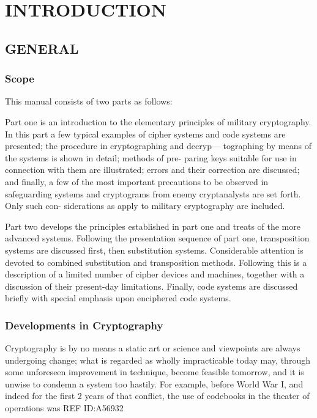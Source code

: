 
\chapter{INTRODUCTION}
 
\section{GENERAL}

\subsection{Scope}

This manual consists of two parts as follows:

\mypara Part one is an introduction to the elementary principles of military
cryptography. In this part a few typical examples of cipher systems and
code systems are presented; the procedure in cryptographing and decryp—
tographing by means of the systems is shown in detail; methods of pre-
paring keys suitable for use in connection with them are illustrated;
errors and their correction are discussed; and ﬁnally, a few of the most
important precautions to be observed in safeguarding systems and
cryptograms from enemy cryptanalysts are set forth. Only such con-
siderations as apply to military cryptography are included.

\mypara Part two develops the principles established in part one and treats
of the more advanced systems. Following the presentation sequence of
part one, transposition systems are discussed ﬁrst, then substitution
systems. Considerable attention is devoted to combined substitution and
transposition methods. Following this is a description of a limited number
of cipher devices and machines, together with a discussion of their
present-day limitations. Finally, code systems are discussed brieﬂy with
special emphasis upon enciphered code systems.

\subsection{Developments in Cryptography}

\mypara Cryptography is by no means a static art or science and viewpoints
are always undergoing change; what is regarded as wholly impracticable
today may, through some unforeseen improvement in technique, become
feasible tomorrow, and it is unwise to condemn a system too hastily.
For example, before World War I, and indeed for the ﬁrst 2 years of
that conﬂict, the use of codebooks in the theater of operations was
REF ID:A56932

